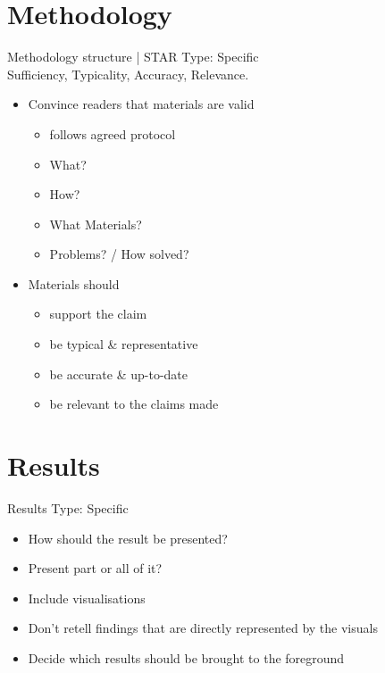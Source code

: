 \documentclass[a4paper,11pt]{article}
\newcounter{counterTODO}\setcounter{counterTODO}{1}
\newcommand\TODO[2][]{%
  \ifshowTodo{%
    \def\varTODOtext{\textcolor{purple}{\texttt{<}\textbf{TODO}\#\arabic{counterTODO}\texttt{: #2>}}}
    \def\varTODOContentLine{\textcolor{purple}{#2}}
    \ifthenelse{\isempty{#1}}%
      {%
        \addcontentsline{tocTODO}{section}{\vspace{-0.3cm}\varTODOContentLine}%
        \varTODOtext\\%
      }%
      {%
        \addcontentsline{tocTODO}{section}{\vspace{-0.3cm}\sout{\varTODOContentLine}}%
      }%
      \stepcounter{counterTODO}%
  }\fi%
}
\newif\ifshowTodo
\begin{document}
  \TODO[]{Finish Introduction}

  

\section{Methodology}

  \begin{notes}{Methodology structure | STAR}
    Type: Specific \\
    Sufficiency, Typicality, Accuracy, Relevance.
    \begin{itemize}
      \item{Convince readers that materials are valid}
        \begin{itemize}
          \item{follows agreed protocol}
          \item{What?}
          \item{How?}
          \item{What Materials?}
          \item{Problems? / How solved?}
        \end{itemize}
      \item{Materials should}
      \begin{itemize}
        \item{support the claim}
        \item{be typical \& representative}
        \item{be accurate \& up-to-date}
        \item{be relevant to the claims made}
      \end{itemize}
    \end{itemize}
  \end{notes}

  \TODO[]{Finish Methodology}

  

\section{Results}

  \begin{notes}{Results}
    Type: Specific
    \begin{itemize}
      \item{How should the result be presented?}
      \item{Present part or all of it?}
      \item{Include visualisations}
      \item{Don't retell findings that are directly represented by the visuals}
      \item{Decide which results should be brought to the foreground}
    \end{itemize}
  \end{notes}
\end{document}
